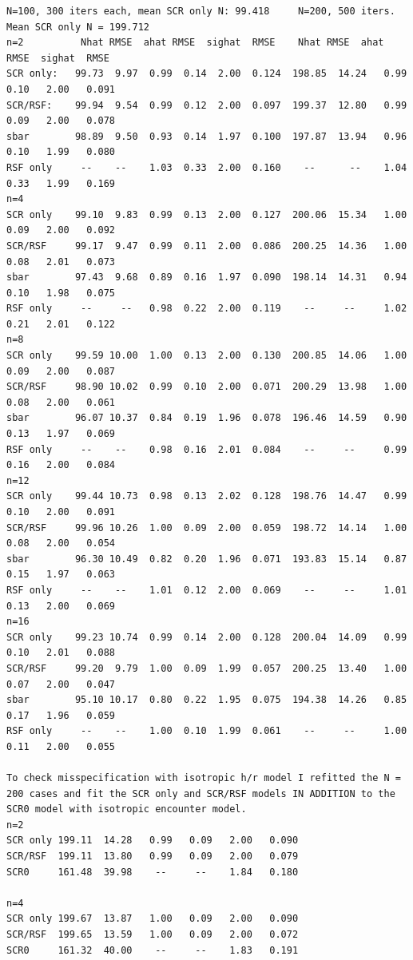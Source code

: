 {\small
\begin{verbatim}
N=100, 300 iters each, mean SCR only N: 99.418     N=200, 500 iters. Mean SCR only N = 199.712
n=2          Nhat RMSE  ahat RMSE  sighat  RMSE    Nhat RMSE  ahat RMSE  sighat  RMSE
SCR only:   99.73  9.97  0.99  0.14  2.00  0.124  198.85  14.24   0.99   0.10   2.00   0.091
SCR/RSF:    99.94  9.54  0.99  0.12  2.00  0.097  199.37  12.80   0.99   0.09   2.00   0.078
sbar        98.89  9.50  0.93  0.14  1.97  0.100  197.87  13.94   0.96   0.10   1.99   0.080
RSF only     --    --    1.03  0.33  2.00  0.160    --      --    1.04   0.33   1.99   0.169
n=4
SCR only    99.10  9.83  0.99  0.13  2.00  0.127  200.06  15.34   1.00   0.09   2.00   0.092
SCR/RSF     99.17  9.47  0.99  0.11  2.00  0.086  200.25  14.36   1.00   0.08   2.01   0.073
sbar        97.43  9.68  0.89  0.16  1.97  0.090  198.14  14.31   0.94   0.10   1.98   0.075
RSF only     --     --   0.98  0.22  2.00  0.119    --     --     1.02   0.21   2.01   0.122
n=8
SCR only    99.59 10.00  1.00  0.13  2.00  0.130  200.85  14.06   1.00   0.09   2.00   0.087
SCR/RSF     98.90 10.02  0.99  0.10  2.00  0.071  200.29  13.98   1.00   0.08   2.00   0.061
sbar        96.07 10.37  0.84  0.19  1.96  0.078  196.46  14.59   0.90   0.13   1.97   0.069
RSF only     --    --    0.98  0.16  2.01  0.084    --     --     0.99   0.16   2.00   0.084
n=12
SCR only    99.44 10.73  0.98  0.13  2.02  0.128  198.76  14.47   0.99   0.10   2.00   0.091
SCR/RSF     99.96 10.26  1.00  0.09  2.00  0.059  198.72  14.14   1.00   0.08   2.00   0.054
sbar        96.30 10.49  0.82  0.20  1.96  0.071  193.83  15.14   0.87   0.15   1.97   0.063
RSF only     --    --    1.01  0.12  2.00  0.069    --     --     1.01   0.13   2.00   0.069
n=16
SCR only    99.23 10.74  0.99  0.14  2.00  0.128  200.04  14.09   0.99   0.10   2.01   0.088
SCR/RSF     99.20  9.79  1.00  0.09  1.99  0.057  200.25  13.40   1.00   0.07   2.00   0.047
sbar        95.10 10.17  0.80  0.22  1.95  0.075  194.38  14.26   0.85   0.17   1.96   0.059
RSF only     --    --    1.00  0.10  1.99  0.061    --     --     1.00   0.11   2.00   0.055

To check misspecification with isotropic h/r model I refitted the N =
200 cases and fit the SCR only and SCR/RSF models IN ADDITION to the
SCR0 model with isotropic encounter model.
n=2
SCR only 199.11  14.28   0.99   0.09   2.00   0.090
SCR/RSF  199.11  13.80   0.99   0.09   2.00   0.079
SCR0     161.48  39.98    --     --    1.84   0.180

n=4
SCR only 199.67  13.87   1.00   0.09   2.00   0.090
SCR/RSF  199.65  13.59   1.00   0.09   2.00   0.072
SCR0     161.32  40.00    --     --    1.83   0.191


\end{verbatim}}
